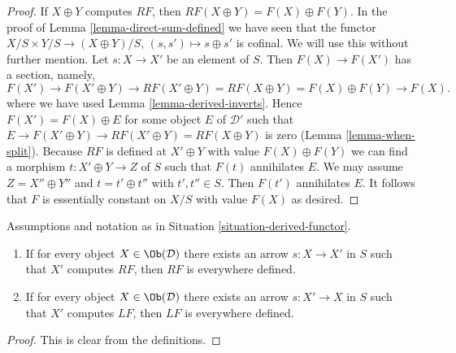 \begin{proof}
If $X \oplus Y$ computes $RF$, then $RF(X \oplus Y) = F(X) \oplus F(Y)$.
In the proof of Lemma \ref{lemma-direct-sum-defined} we have seen that
the functor $X/S \times Y/S \to (X \oplus Y)/S$, $(s, s') \mapsto s \oplus s'$
is cofinal. We will use this without further mention. Let $s : X \to X'$ be
an element of $S$. Then $F(X) \to F(X')$ has a section, namely,
$$
F(X') \to F(X' \oplus Y) \to RF(X' \oplus Y) =
RF(X \oplus Y) = F(X) \oplus F(Y) \to F(X).
$$
where we have used Lemma \ref{lemma-derived-inverts}.
Hence $F(X') = F(X) \oplus E$ for some object $E$ of $\mathcal{D}'$
such that $E \to F(X' \oplus Y) \to RF(X'\oplus Y) = RF(X \oplus Y)$
is zero (Lemma \ref{lemma-when-split}).
Because $RF$ is defined at $X' \oplus Y$ with value
$F(X) \oplus F(Y)$ we can find a morphism $t : X' \oplus Y \to Z$
of $S$ such that $F(t)$ annihilates $E$. We may assume
$Z = X'' \oplus Y''$ and $t = t' \oplus t''$ with $t', t'' \in S$.
Then $F(t')$ annihilates $E$. It follows that $F$ is essentially constant
on $X/S$ with value $F(X)$ as desired.
\end{proof}

\begin{lemma}
\label{lemma-existence-computes}
Assumptions and notation as in
Situation \ref{situation-derived-functor}.
\begin{enumerate}
\item If for every object $X \in \Ob(\mathcal{D})$
there exists an arrow $s : X \to X'$ in $S$ such that $X'$ computes
$RF$, then $RF$ is everywhere defined.
\item If for every object $X \in \Ob(\mathcal{D})$
there exists an arrow $s : X' \to X$ in $S$ such that $X'$ computes
$LF$, then $LF$ is everywhere defined.
\end{enumerate}
\end{lemma}

\begin{proof}
This is clear from the definitions.
\end{proof}

